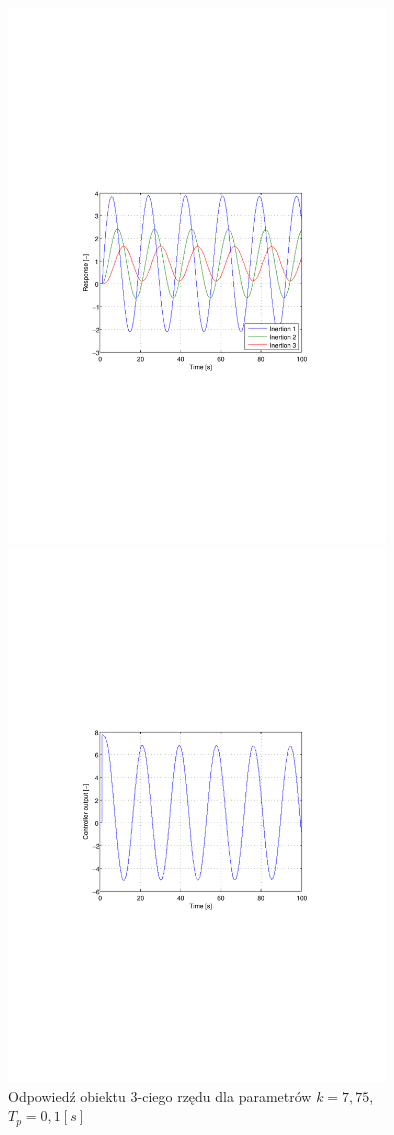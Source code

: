 \documentclass[12pt]{article}
\begin{document}
\newpage

\begin{figure}[!htb]
	\begin{center}
		\includegraphics[trim=5cm 9cm 5cm 9cm,width=10cm]{../res/img/d2_0,1_7,75y.pdf}
	\end{center}
	
	\begin{center}
		\includegraphics[trim=5cm 9cm 5cm 9cm,width=10cm]{../res/img/d2_0,1_7,75u.pdf} 
	\end{center}
	\caption{Odpowiedź obiektu 3-ciego rzędu dla parametrów $k=7,75$,
	$T_p=0,1[s]$}
\end{figure}
\end{document}
